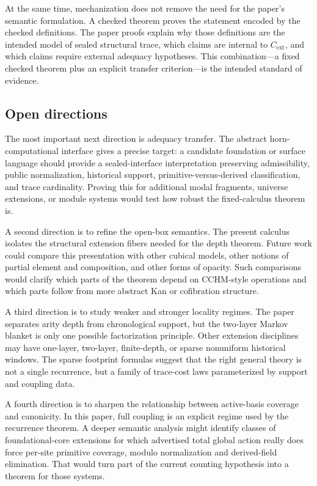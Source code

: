 \documentclass{lmcs}
\begin{document}
At the same time, mechanization does not remove the need for the paper's semantic
formulation.  A checked theorem proves the statement encoded by the checked definitions.  The
paper proofs explain why those definitions are the intended model of sealed structural trace,
which claims are internal to \(C_{\mathrm{ext}}\), and which claims require external adequacy
hypotheses.  This combination---a fixed checked theorem plus an explicit transfer
criterion---is the intended standard of evidence.

\subsection{Open directions}
\label{subsec:conclusion-open-directions}

The most important next direction is adequacy transfer.  The abstract horn-computational
interface gives a precise target: a candidate foundation or surface language should provide a
sealed-interface interpretation preserving admissibility, public normalization, historical
support, primitive-versus-derived classification, and trace cardinality.  Proving this for
additional modal fragments, universe extensions, or module systems would test how robust the
fixed-calculus theorem is.

A second direction is to refine the open-box semantics.  The present calculus isolates the
structural extension fibers needed for the depth theorem.  Future work could compare this
presentation with other cubical models, other notions of partial element and composition, and
other forms of opacity.  Such comparisons would clarify which parts of the theorem depend on
CCHM-style operations and which parts follow from more abstract Kan or cofibration structure.

A third direction is to study weaker and stronger locality regimes.  The paper separates arity
depth from chronological support, but the two-layer Markov blanket is only one possible
factorization principle.  Other extension disciplines may have one-layer, two-layer,
finite-depth, or sparse nonuniform historical windows.  The sparse footprint formulas suggest
that the right general theory is not a single recurrence, but a family of trace-cost laws
parameterized by support and coupling data.

A fourth direction is to sharpen the relationship between active-basis coverage and
canonicity.  In this paper, full coupling is an explicit regime used by the recurrence theorem.
A deeper semantic analysis might identify classes of foundational-core extensions for which
advertised total global action really does force per-site primitive coverage, modulo
normalization and derived-field elimination.  That would turn part of the current counting
hypothesis into a theorem for those systems.
\end{document}
